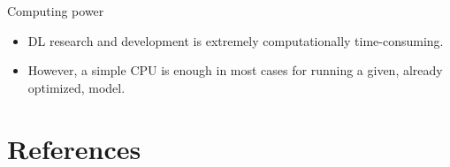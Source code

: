 \documentclass[xcolor=pdftex,dvipsnames,table,mathserif]{beamer}
\begin{document}
\begin{frame}{Computing power}

  \begin{alertblock}{}
    \begin{itemize}
    \item   DL research and development is extremely computationally time-consuming.
    \item   However, a simple CPU is enough in most cases for running a given, already optimized, model.
    \end{itemize}
  \end{alertblock}
\end{frame}






\section*{References}


\end{document}
